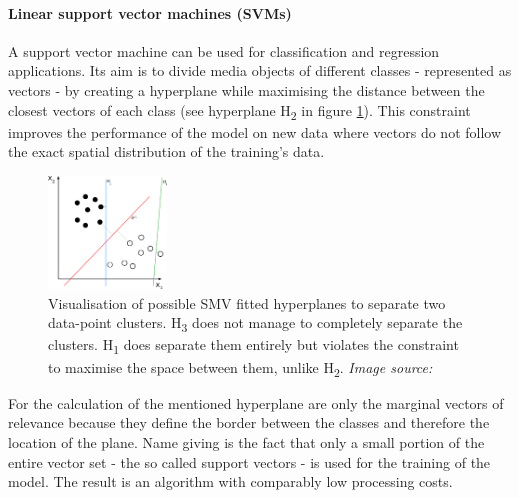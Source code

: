 \paragraph*{Linear support vector machines (SVMs)}
A support vector machine can be used for classification and regression applications. Its aim is to divide media objects of different classes - represented as vectors - by creating a hyperplane while maximising the distance between the closest vectors of each class (see hyperplane H\textsubscript{2} in figure \ref{fig:SVM_visualisation}). This constraint improves the performance of the model on new data where vectors do not follow the exact spatial distribution of the training's data.

\begin{figure} %
    \centerline{\includegraphics[trim={0 0 0 0},clip,width=0.28\textwidth]{img/Svm_separating_hyperplanes}}
  \caption{Visualisation of possible SMV fitted hyperplanes to separate two data-point clusters. H\textsubscript{3} does not manage to completely separate the clusters. H\textsubscript{1} does separate them entirely but violates the constraint to maximise the space between them, unlike H\textsubscript{2}. \textit{Image source:} \parencite{Wikipedia}}
  \label{fig:SVM_visualisation}
\vspace{-0.5cm}
\end{figure}

For the calculation of the mentioned hyperplane are only the marginal vectors of relevance because they define the border between the classes and therefore the location of the plane. Name giving is the fact that only a small portion of the entire vector set - the so called support vectors - is used for the training of the model. The result is an algorithm with comparably low processing costs.

